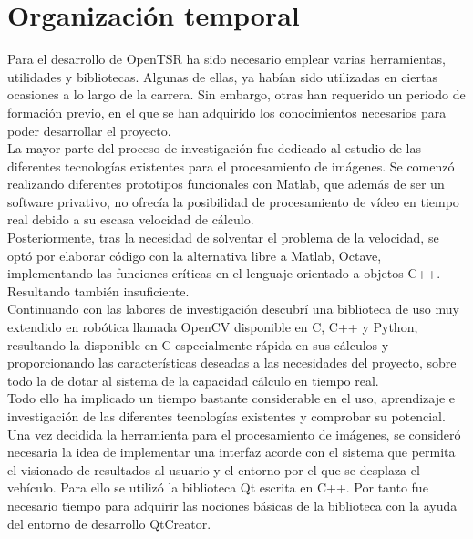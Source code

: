 

\chapter{Organización temporal}
\label{chap:organización-temporal}

Para el desarrollo de OpenTSR ha sido necesario emplear varias herramientas, utilidades y bibliotecas. Algunas de ellas, ya habían sido utilizadas en ciertas ocasiones a lo largo de la carrera. Sin embargo, otras han requerido un periodo de formación previo, en el que se han adquirido los conocimientos necesarios para poder desarrollar el proyecto.\\

La mayor parte del proceso de investigación fue dedicado al estudio de las diferentes tecnologías existentes para el procesamiento de imágenes. Se comenzó realizando diferentes prototipos funcionales con Matlab, que además de ser un software privativo, no ofrecía la posibilidad de procesamiento de vídeo en tiempo real debido a su escasa velocidad de cálculo.\\

Posteriormente, tras la necesidad de solventar el problema de la velocidad, se optó por elaborar código con la alternativa libre a Matlab, Octave, implementando las funciones críticas en el lenguaje orientado a objetos C++. Resultando también insuficiente.\\

Continuando con las labores de investigación descubrí una biblioteca de uso muy extendido en robótica llamada OpenCV disponible en C, C++ y Python, resultando la disponible en C especialmente rápida en sus cálculos y proporcionando las características deseadas a las necesidades del proyecto, sobre todo la de dotar al sistema de la capacidad cálculo en tiempo real.\\

Todo ello ha implicado un tiempo bastante considerable en el uso, aprendizaje e investigación de las diferentes tecnologías existentes y comprobar su potencial.\\

Una vez decidida la herramienta para el procesamiento de imágenes, se consideró necesaria la idea de implementar una interfaz acorde con el sistema que permita el visionado de resultados al usuario y el entorno por el que se desplaza el vehículo. Para ello se utilizó la biblioteca Qt escrita en C++. Por tanto fue necesario tiempo para adquirir las nociones básicas de la biblioteca con la ayuda del entorno de desarrollo QtCreator.\\

